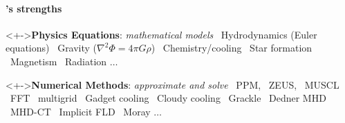 \begin{frame}[fragile,label=ss-motivation] 
\secframetitle{\ssMotivation}




  \framesubtitle{\enzo's strengths}
\centerline{\textbf{
}}
\begin{block}<+->{\textbf{Physics Equations}: \textit{mathematical models}}
   \textcolor{red!80!black}{
 \footnotesize
    \textbullet\ Hydrodynamics (Euler equations)
    \textbullet\ Gravity ($\nabla^2\Phi=4\pi G\rho$)
    \textbullet\ Chemistry/cooling
    \textbullet\ Star formation
    \textbullet\ Magnetism
    \textbullet\ Radiation \Large $\ldots$
    }
\end{block}

\begin{block}<+->{\textbf{Numerical Methods}: \textit{approximate and solve}}
    \textcolor{green!50!black}{
\footnotesize     \textbullet\ PPM, \textbullet\ ZEUS, \textbullet\ MUSCL
     \textbullet\ FFT \textbullet\ multigrid
     \textbullet\ Gadget cooling
     \textbullet\ Cloudy cooling
     \textbullet\ Grackle
     \textbullet\ Dedner MHD
     \textbullet\ MHD-CT
     \textbullet\ Implicit FLD
     \textbullet\ Moray \Large $\ldots$
     }
  \end{block}


\end{frame}
